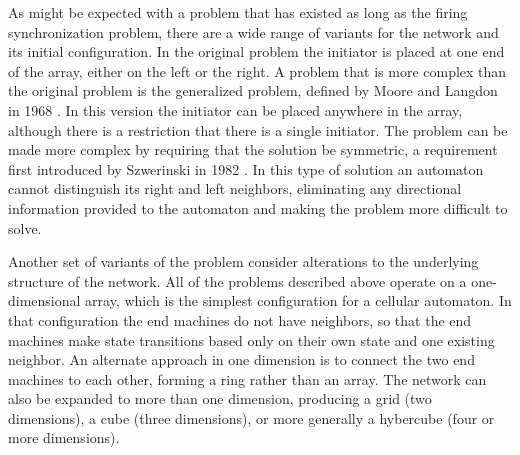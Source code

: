 \documentclass{article}
\begin{document}
    
As might be expected with a problem that has existed as long as the firing synchronization problem, there are a wide range of variants for the network and its initial configuration. In the original problem the initiator is placed at one end of the array, either on the left or the right. A problem that is more complex than the original problem is the generalized problem, defined by Moore and Langdon in 1968 \cite{MooreLangdon1968}. In this version the initiator can be placed anywhere in the array, although there is a restriction that there is a single initiator. The problem can be made more complex by requiring that the solution be symmetric, a requirement first introduced by Szwerinski in 1982 \cite{szwerinski1982time}. In this type of solution an automaton cannot distinguish its right and left neighbors, eliminating any directional information provided to the automaton and making the problem more difficult to solve.

Another set of variants of the problem consider alterations to the underlying structure of the network. All of the problems described above operate on a one-dimensional array, which is the simplest configuration for a cellular automaton. In that configuration the end machines do not have neighbors, so that the end machines make state transitions based only on their own state and one existing neighbor. An alternate approach in one dimension is to connect the two end machines to each other, forming a ring rather than an array. The network can also be expanded to more than one dimension, producing a grid (two dimensions), a cube (three dimensions), or more generally a hybercube (four or more dimensions).
\end{document}
